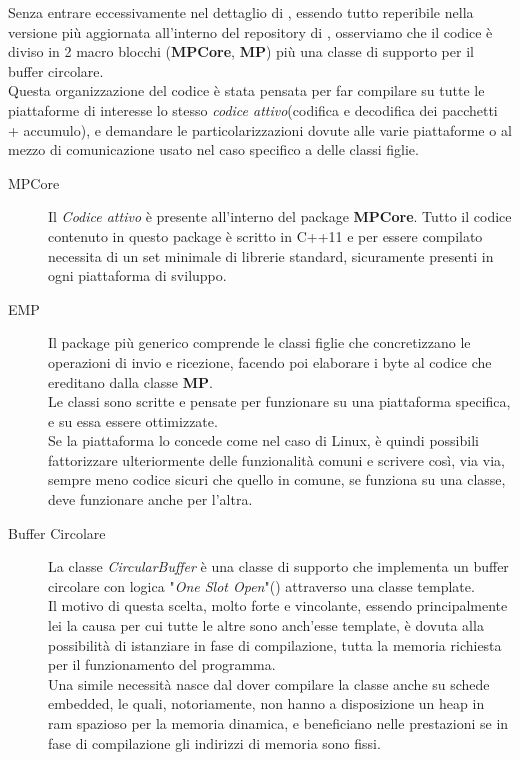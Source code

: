 \noindent
Senza entrare eccessivamente nel dettaglio di , essendo tutto reperibile nella versione più aggiornata all'interno del repository di \cite*{EMP}, osserviamo che il codice è diviso in 2 macro blocchi (\textbf{MPCore}, \textbf{MP}) più una classe di supporto per il buffer circolare.\\
Questa organizzazione del codice è stata pensata per far compilare su tutte le piattaforme di interesse lo stesso \textit{codice attivo}(codifica e decodifica dei pacchetti + accumulo), e demandare le particolarizzazioni dovute alle varie piattaforme o al mezzo di comunicazione usato nel caso specifico a delle classi figlie.\\
\begin{spacing}{1.25}
	\begin{description}
		\item[MPCore] Il \textit{Codice attivo} è presente all'interno del package \textbf{MPCore}. Tutto il codice contenuto in questo package è scritto in C++11 e per essere compilato necessita di un set minimale di librerie standard, sicuramente presenti in ogni piattaforma di sviluppo.
		\item[EMP] Il package più generico comprende le classi figlie che concretizzano le operazioni di invio e ricezione, facendo poi elaborare i byte al codice che ereditano dalla classe \textbf{MP}.\\
		      Le classi sono scritte e pensate per funzionare su una piattaforma specifica, e su essa essere ottimizzate.\\
		      Se la piattaforma lo concede come nel caso di Linux, è quindi possibili fattorizzare ulteriormente delle funzionalità comuni e scrivere così, via via, sempre meno codice sicuri che quello in comune, se funziona su una classe, deve funzionare anche per l'altra.
		\item[Buffer Circolare] La classe \textit{CircularBuffer} è una classe di supporto che implementa un buffer circolare con logica "\textit{One Slot Open}"(\cite{CircularBuffer}) attraverso una classe template.\\
		      Il motivo di questa scelta, molto forte e vincolante, essendo principalmente lei la causa per cui tutte le altre sono anch'esse template, è dovuta alla possibilità di istanziare in fase di compilazione, tutta la memoria richiesta per il funzionamento del programma.\\
		      Una simile necessità nasce dal dover compilare la classe anche su schede embedded, le quali, notoriamente, non hanno a disposizione un heap in ram spazioso per la memoria dinamica, e beneficiano nelle prestazioni se in fase di compilazione gli indirizzi di memoria sono fissi.
	\end{description}
\end{spacing}
\vspace{0mm}
